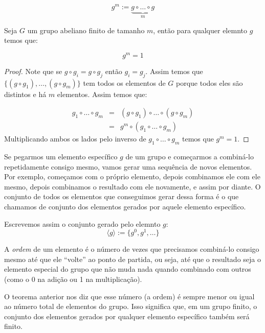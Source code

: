 \begin{displaymath}
  g^m := \underbrace{g \circ \dots \circ g}_m
\end{displaymath}


\begin{theorem}[Euller]
\label{theo:gen-euler}
Seja $G$ um grupo abeliano finito de tamanho $m$, então para qualquer elemnto $g$ temos que:

\begin{displaymath}
  g^m = 1
\end{displaymath}
\end{theorem}
\begin{proof}
  Note que se $g \circ g_i = g \circ g_j$ então $g_i = g_j$.
  Assim temos que $\{(g \circ g_1), \dots, (g \circ g_m)\}$ tem todos os elementos de $G$ porque todos eles são distintos e há $m$ elementos.
  Assim temos que:

  \begin{eqnarray*}
    g_1 \circ \dots \circ g_m & = & (g \circ g_1) \circ \dots \circ (g \circ g_m)\\
                              & = & g^m \circ (g_1 \circ \dots \circ g_m)
  \end{eqnarray*}
  Multiplicando ambos os lados pelo inverso de $g_1 \circ \dots \circ g_m$ temos que $g^m = 1$.
\end{proof}

Se pegarmos um elemento específico $g$ de um grupo e começarmos a combiná-lo repetidamente consigo mesmo, vamos gerar uma sequência de novos elementos.
Por exemplo, começamos com o próprio elemento, depois combinamos ele com ele mesmo, depois combinamos o resultado com ele novamente, e assim por diante.
O conjunto de todos os elementos que conseguimos gerar dessa forma é o que chamamos de conjunto dos elementos gerados por aquele elemento específico.

Escrevemos assim o conjunto gerado pelo elemnto $g$:
\begin{displaymath}
  \langle g \rangle := \{g^0, g^1, \dots \}
\end{displaymath}

A {\em ordem} de um elemento é o número de vezes que precisamos combiná-lo consigo mesmo até que ele ``volte'' ao ponto de partida, ou seja, até que o resultado seja o elemento especial do grupo que não muda nada quando combinado com outros (como o 0 na adição ou 1 na multiplicação).

O teorema anterior nos diz que esse número (a ordem) é sempre menor ou igual ao número total de elementos do grupo.
Isso significa que, em um grupo finito, o conjunto dos elementos gerados por qualquer elemento específico também será finito.

